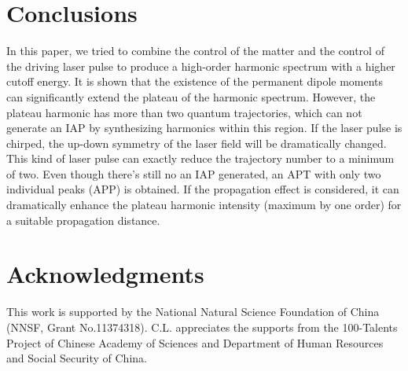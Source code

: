 \documentclass[10pt,letterpaper]{article}
\begin{document}


\section{Conclusions}
In this paper, we tried to combine the control of the matter and the control of the driving laser pulse to produce a high-order harmonic spectrum with a higher cutoff energy. It is shown that the existence of the permanent dipole moments can significantly extend the plateau of the harmonic spectrum. However, the plateau harmonic has more than two quantum trajectories, which can not generate an IAP by synthesizing harmonics within this region. If the laser pulse is chirped, the up-down symmetry of the laser field will be dramatically changed. This kind of laser pulse can exactly reduce the trajectory number to a minimum of two. Even though there's still no an IAP generated, an APT with only two individual peaks (APP) is obtained. If the propagation effect is considered, it can dramatically enhance the plateau harmonic intensity (maximum by one order) for a suitable propagation distance.

\section*{Acknowledgments}
This work is supported by the National Natural Science Foundation of China (NNSF, Grant
No.11374318). C.L. appreciates the supports from the 100-Talents Project of Chinese Academy
of Sciences and Department of Human Resources and Social Security of China.
\end{document}
